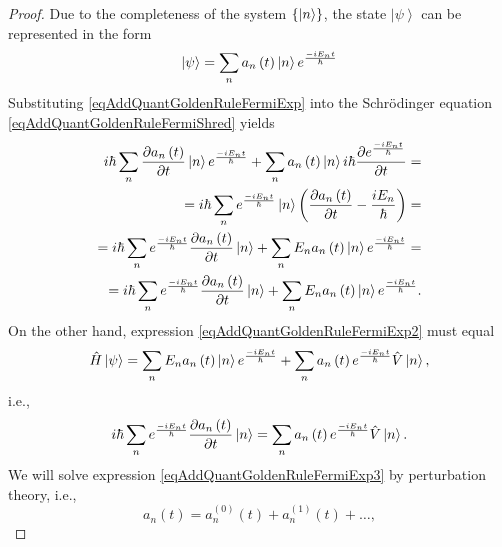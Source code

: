 \begin{proof}
  Due to the completeness of the system $\left\{\ket{n}\right\}$,
  the state $\left|\psi\right>$ can be represented in the form
  \begin{equation}
    \left|\psi\right> = \sum_n a_n\left(t\right) \ket{n}
    e^{\frac{-i E_n t}{\hbar}}
    \label{eqAddQuantGoldenRuleFermiExp}
  \end{equation}
  Substituting \eqref{eqAddQuantGoldenRuleFermiExp} into the Schrödinger equation
  \eqref{eqAddQuantGoldenRuleFermiShred} yields
  \begin{eqnarray}
    i \hbar \sum_n \frac{ \partial a_n\left(t\right)}{\partial t }
    \ket{n} e^{\frac{-i E_n t}{\hbar}} +
    \sum_n a_n\left(t\right) \ket{n}
    i \hbar \frac{\partial e^{\frac{-i E_n t}{\hbar}}}{ \partial t} =
    \\ \nonumber
    = i \hbar \sum_n  e^{\frac{-i E_n t}{\hbar}} \ket{n} \left(
    \frac{ \partial a_n\left(t\right)}{\partial t } - \frac{i E_n}{\hbar} 
    \right) =
    \\ \nonumber
    =  i \hbar \sum_n  e^{\frac{-i E_n t}{\hbar}}
    \frac{ \partial a_n\left(t\right)}{\partial t } \ket{n}+
    \sum_n E_n a_n\left(t\right) \ket{n}
    e^{\frac{-i E_n t}{\hbar}} =
    \nonumber \\
    =
     i \hbar \sum_n  e^{\frac{-i E_n t}{\hbar}}
     \frac{ \partial a_n\left(t\right)}{\partial t } \ket{n}+
      \sum_n E_n a_n\left(t\right) \ket{n}
    e^{\frac{-i E_n t}{\hbar}}.
    \label{eqAddQuantGoldenRuleFermiExp2}
  \end{eqnarray}
  On the other hand, expression \eqref{eqAddQuantGoldenRuleFermiExp2}
  must equal
  \begin{equation}
    \hat{H} \left|\psi\right> =
    \sum_n E_n a_n\left(t\right) \ket{n}
    e^{\frac{-i E_n t}{\hbar}} +
    \sum_n  a_n\left(t\right) 
    e^{\frac{-i E_n t}{\hbar}} \hat{V} \ket{n},
    \nonumber
  \end{equation}
  i.e.,
  \begin{eqnarray}
    i \hbar \sum_n  e^{\frac{-i E_n t}{\hbar}}
    \frac{ \partial a_n\left(t\right)}{\partial t } \ket{n} =
     \sum_n  a_n\left(t\right) 
    e^{\frac{-i E_n t}{\hbar}} \hat{V} \ket{n}.
    \label{eqAddQuantGoldenRuleFermiExp3}
  \end{eqnarray}
  We will solve expression \eqref{eqAddQuantGoldenRuleFermiExp3}
  by perturbation theory, i.e.,
  \begin{equation}
    a_n\left(t\right) = a_n^{(0)}\left(t\right) +
    a_n^{(1)}\left(t\right) + \dots,    
    \nonumber
  \end{equation}

\end{proof}
